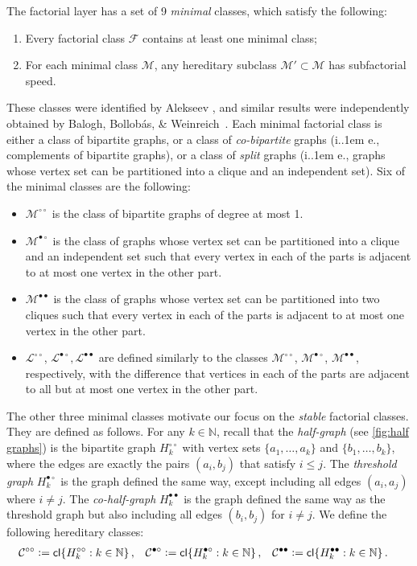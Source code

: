 \documentclass{article}
\makeatletter
\newcommand{\define}{\vcentcolon=}
\newcommand{\cC}{\ensuremath{\mathcal{C}}}
\newcommand{\cF}{\ensuremath{\mathcal{F}}}
\newcommand{\cL}{\ensuremath{\mathcal{L}}}
\newcommand{\cM}{\ensuremath{\mathcal{M}}}
\newcommand{\bN}{\ensuremath{\mathbb{N}}}
\newcommand*\ie{i.\kern.1em e.\@\xspace} %
\newcommand{\cl}{\mathsf{cl}}
\newcommand{\dcirc}{{\circ\circ}}
\newcommand{\bcirc}{{\bullet\circ}}
\newcommand{\dbullet}{{\bullet\bullet}}
\makeatother
\begin{document}
The factorial layer has a set of 9 \emph{minimal} classes, which satisfy the following:
\begin{enumerate}
\item Every factorial class $\cF$ contains at least one minimal class;
\item For each minimal class $\cM$, any  hereditary subclass $\cM' \subset \cM$ has subfactorial
speed.
\end{enumerate}
These classes were identified by Alekseev \cite{Ale97}, and similar results were independently
obtained by Balogh, Bollob{\'a}s, \& Weinreich~\cite{BBW00}.  Each minimal factorial class is either
a class of bipartite graphs, or a class of \emph{co-bipartite} graphs (\ie, complements of bipartite
graphs), or a class of \emph{split} graphs (\ie, graphs whose vertex set can be partitioned into a
clique and an independent set).  Six of the minimal classes are the following:
\begin{itemize}
\item $\cM^{\dcirc}$ is the class of bipartite graphs of degree at most 1. 
\item $\cM^\bcirc$ is the class of graphs whose vertex set can be partitioned into a clique and an independent set
such that every vertex in each of the parts is adjacent to at most one vertex in the other part.
\item $\cM^\dbullet$ is the class of graphs whose vertex set can be partitioned into two cliques
such that every vertex in each of the parts is adjacent to at most one vertex in the other part.
\item $\cL^{\dcirc}$, $\cL^\bcirc, \cL^\dbullet$ are defined similarly to the classes 
$\cM^{\dcirc}$, $\cM^\bcirc$, $\cM^\dbullet$, respectively, with the difference that vertices in
each of the parts are adjacent to all but at most one vertex in the other part.
\end{itemize}
The other three minimal classes motivate our focus on the \emph{stable} factorial classes. They
are defined as follows.
For any $k \in \bN$, recall that the \emph{half-graph} (see \cref{fig:half graphs}) is the bipartite graph $H^{\circ\circ}_k$ with vertex
sets $\{a_1, \dotsc, a_k\}$ and $\{b_1, \dotsc, b_k\}$, where the edges are exactly the pairs
$(a_i,b_j)$ that satisfy $i \leq j$. The \emph{threshold graph} $H^{\bullet\circ}_k$ is the graph
defined the same way, except including all edges $(a_i,a_j)$ where $i \neq j$.  The
\emph{co-half-graph} $H^{\bullet\bullet}_k$ is the graph defined the same way as the threshold graph
but also including all edges $(b_i,b_j)$ for $i \neq j$.  We define the following hereditary
classes:
\begin{align*}
  \cC^\dcirc &\define \cl\{ H_k^\dcirc : k \in \bN \} \,,
  &\cC^\bcirc &\define \cl\{ H_k^\bcirc : k \in \bN \} \,,
  &\cC^\dbullet &\define \cl\{ H_k^\dbullet : k \in \bN \} \,.
\end{align*}
\end{document}
